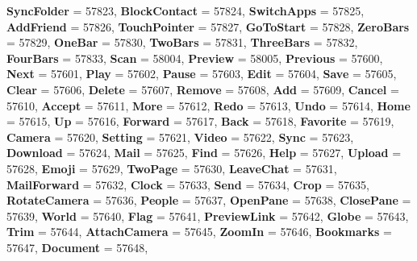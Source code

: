 \begin{DoxyCompactItemize}
{\bfseries Sync\+Folder} = 57823, 
{\bfseries Block\+Contact} = 57824, 
\newline
{\bfseries Switch\+Apps} = 57825, 
{\bfseries Add\+Friend} = 57826, 
{\bfseries Touch\+Pointer} = 57827, 
{\bfseries Go\+To\+Start} = 57828, 
\newline
{\bfseries Zero\+Bars} = 57829, 
{\bfseries One\+Bar} = 57830, 
{\bfseries Two\+Bars} = 57831, 
{\bfseries Three\+Bars} = 57832, 
\newline
{\bfseries Four\+Bars} = 57833, 
{\bfseries Scan} = 58004, 
{\bfseries Preview} = 58005, 
{\bfseries Previous} = 57600, 
\newline
{\bfseries Next} = 57601, 
{\bfseries Play} = 57602, 
{\bfseries Pause} = 57603, 
{\bfseries Edit} = 57604, 
\newline
{\bfseries Save} = 57605, 
{\bfseries Clear} = 57606, 
{\bfseries Delete} = 57607, 
{\bfseries Remove} = 57608, 
\newline
{\bfseries Add} = 57609, 
{\bfseries Cancel} = 57610, 
{\bfseries Accept} = 57611, 
{\bfseries More} = 57612, 
\newline
{\bfseries Redo} = 57613, 
{\bfseries Undo} = 57614, 
{\bfseries Home} = 57615, 
{\bfseries Up} = 57616, 
\newline
{\bfseries Forward} = 57617, 
{\bfseries Back} = 57618, 
{\bfseries Favorite} = 57619, 
{\bfseries Camera} = 57620, 
\newline
{\bfseries Setting} = 57621, 
{\bfseries Video} = 57622, 
{\bfseries Sync} = 57623, 
{\bfseries Download} = 57624, 
\newline
{\bfseries Mail} = 57625, 
{\bfseries Find} = 57626, 
{\bfseries Help} = 57627, 
{\bfseries Upload} = 57628, 
\newline
{\bfseries Emoji} = 57629, 
{\bfseries Two\+Page} = 57630, 
{\bfseries Leave\+Chat} = 57631, 
{\bfseries Mail\+Forward} = 57632, 
\newline
{\bfseries Clock} = 57633, 
{\bfseries Send} = 57634, 
{\bfseries Crop} = 57635, 
{\bfseries Rotate\+Camera} = 57636, 
\newline
{\bfseries People} = 57637, 
{\bfseries Open\+Pane} = 57638, 
{\bfseries Close\+Pane} = 57639, 
{\bfseries World} = 57640, 
\newline
{\bfseries Flag} = 57641, 
{\bfseries Preview\+Link} = 57642, 
{\bfseries Globe} = 57643, 
{\bfseries Trim} = 57644, 
\newline
{\bfseries Attach\+Camera} = 57645, 
{\bfseries Zoom\+In} = 57646, 
{\bfseries Bookmarks} = 57647, 
{\bfseries Document} = 57648, 

\end{DoxyCompactItemize}

